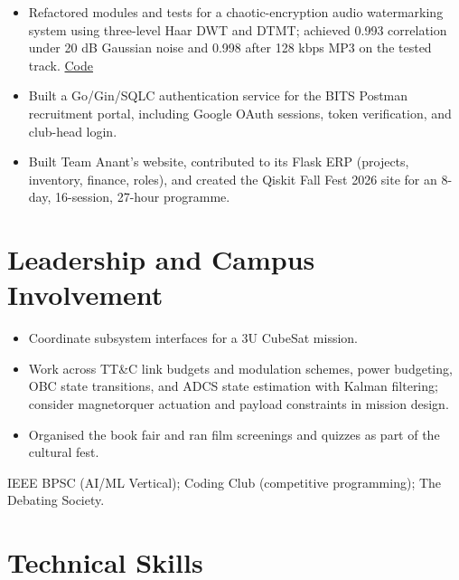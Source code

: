 \documentclass[a4paper, 11pt]{article}
\begin{document}
\begin{samepage}
\begin{itemize}
    \item Refactored modules and tests for a chaotic-encryption audio watermarking system using three-level Haar DWT and DTMT; achieved 0.993 correlation under 20 dB Gaussian noise and 0.998 after 128 kbps MP3 on the tested track. \href{https://github.com/Meghadri25/dsp-project}{Code}
    \item Built a Go/Gin/SQLC authentication service for the BITS Postman recruitment portal, including Google OAuth sessions, token verification, and club-head login.
    \item Built Team Anant's website, contributed to its Flask ERP (projects, inventory, finance, roles), and created the Qiskit Fall Fest 2026 site for an 8-day, 16-session, 27-hour programme.
\end{itemize}
\end{samepage}
\resumeSubHeadingListEnd

\section{Leadership and Campus Involvement}
\resumeSubHeadingListStart
{}
\begin{itemize}
    \item Coordinate subsystem interfaces for a 3U CubeSat mission.
    \item Work across TT\&C link budgets and modulation schemes, power budgeting, OBC state transitions, and ADCS state estimation with Kalman filtering; consider magnetorquer actuation and payload constraints in mission design.
\end{itemize}
\begin{itemize}
    \item Organised the book fair and ran film screenings and quizzes as part of the cultural fest.
\end{itemize}
\item IEEE BPSC (AI/ML Vertical); Coding Club (competitive programming); The Debating Society.
\resumeSubHeadingListEnd

\section{Technical Skills}
\resumeSkillsListStart
\resumeSkillsListEnd
\end{document}
